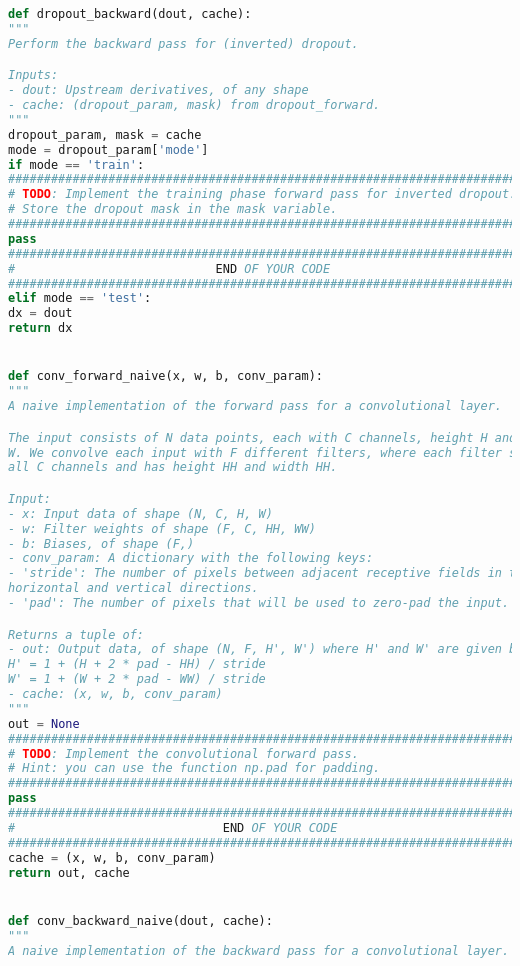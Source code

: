 \begin{lstlisting}[language=Python, label=lst:layers.py, caption={layers.py}, basicstyle=\tiny]
def dropout_backward(dout, cache):
"""
Perform the backward pass for (inverted) dropout.

Inputs:
- dout: Upstream derivatives, of any shape
- cache: (dropout_param, mask) from dropout_forward.
"""
dropout_param, mask = cache
mode = dropout_param['mode']
if mode == 'train':
###########################################################################
# TODO: Implement the training phase forward pass for inverted dropout.   #
# Store the dropout mask in the mask variable.                            #
###########################################################################
pass
###########################################################################
#                            END OF YOUR CODE                             #
###########################################################################
elif mode == 'test':
dx = dout
return dx


def conv_forward_naive(x, w, b, conv_param):
"""
A naive implementation of the forward pass for a convolutional layer.

The input consists of N data points, each with C channels, height H and width
W. We convolve each input with F different filters, where each filter spans
all C channels and has height HH and width HH.

Input:
- x: Input data of shape (N, C, H, W)
- w: Filter weights of shape (F, C, HH, WW)
- b: Biases, of shape (F,)
- conv_param: A dictionary with the following keys:
- 'stride': The number of pixels between adjacent receptive fields in the
horizontal and vertical directions.
- 'pad': The number of pixels that will be used to zero-pad the input.

Returns a tuple of:
- out: Output data, of shape (N, F, H', W') where H' and W' are given by
H' = 1 + (H + 2 * pad - HH) / stride
W' = 1 + (W + 2 * pad - WW) / stride
- cache: (x, w, b, conv_param)
"""
out = None
#############################################################################
# TODO: Implement the convolutional forward pass.                           #
# Hint: you can use the function np.pad for padding.                        #
#############################################################################
pass
#############################################################################
#                             END OF YOUR CODE                              #
#############################################################################
cache = (x, w, b, conv_param)
return out, cache


def conv_backward_naive(dout, cache):
"""
A naive implementation of the backward pass for a convolutional layer.


\end{lstlisting}
